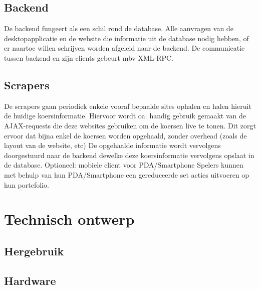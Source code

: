\section{Backend}

De backend fungeert als een schil rond de database. Alle aanvragen van de desktopapplicatie en de website die informatie uit de database nodig hebben, of er naartoe willen schrijven worden afgeleid naar de backend. De communicatie tussen backend en zijn clients gebeurt mbv XML-RPC. 

\section{Scrapers}

De scrapers gaan periodiek enkele vooraf bepaalde sites ophalen en halen hieruit de huidige koersinformatie. Hiervoor wordt oa. handig gebruik gemaakt van de AJAX-requests die deze websites gebruiken om de koersen live te tonen. Dit zorgt ervoor dat bijna enkel de koersen worden opgehaald, zonder overhead (zoals de layout van de website, etc) 
De opgehaalde informatie wordt vervolgens doorgestuurd naar de backend dewelke deze koersinformatie vervolgens opslaat in de database. 
Optioneel: mobiele client voor PDA/Smartphone 
Spelers kunnen met behulp van hun PDA/Smartphone een gereduceerde set acties uitvoeren op hun portefolio.


%
%

\chapter{Technisch ontwerp}

\section{Hergebruik}


\section{Hardware}

